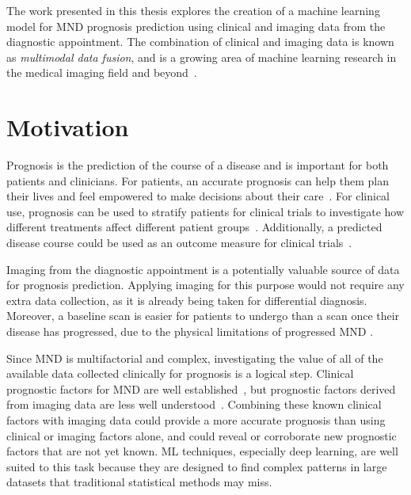 The work presented in this thesis explores the creation of a machine learning model for MND prognosis prediction using clinical and imaging data from the diagnostic appointment.
The combination of clinical and imaging data is known as \textit{multimodal data fusion}, and is a growing area of machine learning research in the medical imaging field and beyond~\cite{cuiDeepMultimodalFusion2022, mohsenArtificialIntelligencebasedMethods2022}.

\section{Motivation}


Prognosis is the prediction of the course of a disease and is important for both patients and clinicians.
For patients, an accurate prognosis can help them plan their lives and feel empowered to make decisions about their care~\cite{talbotClinicalToolPredicting2016, vaneenennaamDiscussingPersonalizedPrognosis2021}.
For clinical use, prognosis can be used to stratify patients for clinical trials to investigate how different treatments affect different patient groups~\cite{berryImprovedStratificationALS2018}.
Additionally, a predicted disease course could be used as an outcome measure for clinical trials~\cite{kiernanImprovingClinicalTrial2021}.

Imaging from the diagnostic appointment is a potentially valuable source of data for prognosis prediction.
Applying imaging for this purpose would not require any extra data collection, as it is already being taken for differential diagnosis.
Moreover, a baseline scan is easier for patients to undergo than a scan once their disease has progressed, due to the physical limitations of progressed MND .

Since MND is multifactorial and complex, investigating the value of all of the available data collected clinically for prognosis is a logical step.
Clinical prognostic factors for MND are well established~\cite{suPredictorsSurvivalPatients2021}, but prognostic factors derived from imaging data are less well understood~\cite{bedeLessonsALSImaging2014}.
Combining these known clinical factors with imaging data could provide a more accurate prognosis than using clinical or imaging factors alone, and could reveal or corroborate new prognostic factors that are not yet known.
ML techniques, especially deep learning, are well suited to this task because they are designed to find complex patterns in large datasets that traditional statistical methods may miss.


